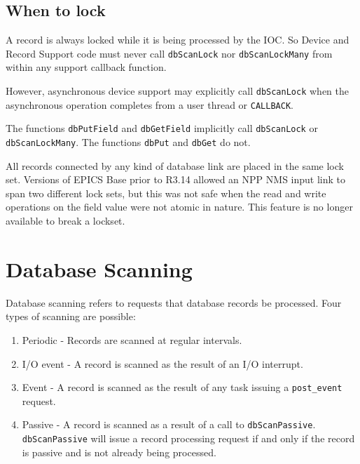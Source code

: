 \subsection{When to lock}

A record is always locked while it is being processed by the IOC.
So Device and Record Support code must never call \verb|dbScanLock| nor \verb|dbScanLockMany| from within any support callback function.

However, asynchronous device support may explicitly call \verb|dbScanLock| when the asynchronous operation completes from a user thread or \verb|CALLBACK|.

The functions \verb|dbPutField| and \verb|dbGetField| implicitly call \verb|dbScanLock| or \verb|dbScanLockMany|.
The functions \verb|dbPut| and \verb|dbGet| do not.

All records connected by any kind of database link are placed in the same lock set.
Versions of EPICS Base prior to R3.14 allowed an NPP NMS input link to span two different lock sets, but this was not safe when the read and write operations on the field value were not atomic in nature.
This feature is no longer available to break a lockset.

\section{Database Scanning}

Database scanning refers to requests that database records be processed.
Four types of scanning are possible:

\begin{enumerate}
\item {}Periodic - Records are scanned at regular intervals.

\item {}I/O event - A record is scanned as the result of an I/O interrupt.

\item {}Event - A record is scanned as the result of any task issuing a \verb|post_event| request.

\item {}Passive - A record is scanned as a result of a call to \verb|dbScanPassive|.
\verb|dbScanPassive| will issue a record processing request if and only if the record is passive and is not already being processed.

\end{enumerate}

